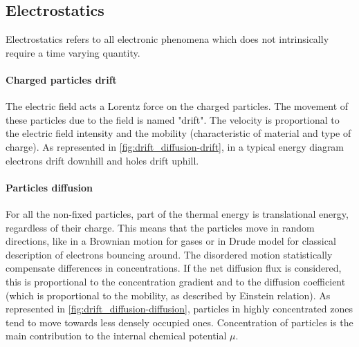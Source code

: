	\subsection{Electrostatics}
		Electrostatics refers to all electronic phenomena which does not intrinsically require a time varying quantity.


		\begin{figure}
		\end{figure}

		\paragraph{Charged particles drift}\label{intro_drift}
		The electric field acts a Lorentz force on the charged particles.
		The movement of these particles due to the field is named "drift".
		The velocity is proportional to the electric field intensity and the mobility (characteristic of material and type of charge).
		As represented in \cref{fig:drift_diffusion-drift}, in a typical energy diagram electrons drift downhill and holes drift uphill.

		\paragraph{Particles diffusion}\label{intro_diffusion}
		For all the non-fixed particles, part of the thermal energy is translational energy, regardless of their charge.
		This means that the particles move in random directions, like in a Brownian motion for gases or in Drude model for classical description of electrons bouncing around.
		The disordered motion statistically compensate differences in concentrations.
		If the net diffusion flux is considered, this is proportional to the concentration gradient and to the diffusion coefficient (which is proportional to the mobility, as described by Einstein relation).
		As represented in \cref{fig:drift_diffusion-diffusion}, particles in highly concentrated zones tend to move towards less densely occupied ones.
		Concentration of particles is the main contribution to the internal chemical potential $\mu$.

